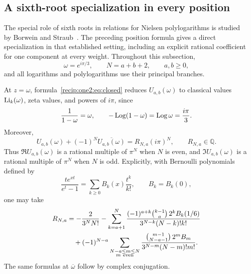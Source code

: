 \subsection{A sixth-root specialization in every position}
\label{recip:one2:sec:sixthroot}

The special role of sixth roots in relations for Nielsen polylogarithms
is studied by Borwein and Straub~\cite{gaussian:BorweinStraub2015}.  The preceding
position formula gives a direct specialization in that established
setting, including an explicit rational coefficient for one component
at every weight.  Throughout this subsection,
\[
 \omega=e^{i\pi/3},\qquad N=a+b+2,\qquad a,b\ge0,
\]
and all logarithms and polylogarithms use their principal branches.

\begin{corollary}
\label{recip:one2:cor:sixthroot}
At $z=\omega$, formula~\eqref{recip:one2:eq:closed} reduces
$U_{a,b}(\omega)$ to classical values $\operatorname{Li}_k(\omega)$, zeta values,
and powers of $i\pi$, since
\begin{equation}
 \frac1{1-\omega}=\omega,\qquad
 -\operatorname{Log}(1-\omega)=\operatorname{Log}\omega=\frac{i\pi}{3}.
 \label{recip:one2:eq:sixthfixed}
\end{equation}
Moreover,
\begin{equation}
 U_{a,b}(\omega)+(-1)^N\overline{U_{a,b}(\omega)}
       =R_{N,a}(i\pi)^N,\qquad R_{N,a}\in\mathbb Q.
 \label{recip:one2:eq:sixthparity}
\end{equation}
Thus $\Re U_{a,b}(\omega)$ is a rational multiple of $\pi^N$
when $N$ is even, and $\Im U_{a,b}(\omega)$ is a rational multiple
of $\pi^N$ when $N$ is odd.  Explicitly, with Bernoulli polynomials
defined by
\[
 \frac{t e^{xt}}{e^t-1}
    =\sum_{k\ge0}B_k(x)\frac{t^k}{k!},\qquad B_k=B_k(0),
\]
one may take
\begin{align}
 R_{N,a}
 &=-\frac{2}{3^N N!}
 -\sum_{k=a+1}^{N}
   \frac{(-1)^{a+k}\binom{k-1}{a}\,2^k B_k(1/6)}
        {3^{N-k}(N-k)!k!}\notag\\
 &\quad+(-1)^{N-a}
   \sum_{\substack{N-a\le m\le N\\m\ \mathrm{even}}}
   \frac{\binom{m-1}{N-a-1}\,2^m B_m}
        {3^{N-m}(N-m)!m!}.
 \label{recip:one2:eq:sixthcoefficient}
\end{align}
The same formulas at $\overline\omega$ follow by complex conjugation.
\end{corollary}
